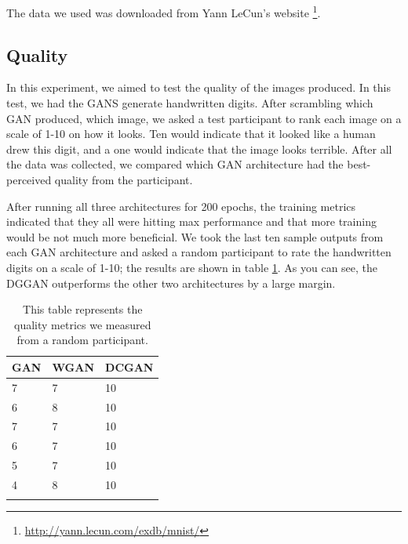 \documentclass[12pt,
 reprint,
nofootinbib,
 amsmath,amssymb,
 aps,
floatfix,
]{revtex4-2}
\begin{document}
The data we used was downloaded from Yann LeCun's website \footnote{\url{http://yann.lecun.com/exdb/mnist/}}.


\subsection{\label{sec:expQuality}Quality}

In this experiment, we aimed to test the quality of the images produced. In this test, we had the GANS generate handwritten digits. After scrambling which GAN produced, which image, we asked a test participant to rank each image on a scale of 1-10 on how it looks. Ten would indicate that it looked like a human drew this digit, and a one would indicate that the image looks terrible. After all the data was collected, we compared which GAN architecture had the best-perceived quality from the participant. 

After running all three architectures for 200 epochs, the training metrics indicated that they all were hitting max performance and that more training would be not much more beneficial. We took the last ten sample outputs from each GAN architecture and asked a random participant to rate the handwritten digits on a scale of 1-10; the results are shown in table \ref{tab:quality}. As you can see, the DGGAN outperforms the other two architectures by a large margin. 

\begin{table}[]
\caption{\label{tab:quality}This table represents the quality metrics we measured from a random participant. }
\begin{tabular}{lll}
\hline
\multicolumn{1}{|l|}{GAN} & \multicolumn{1}{l|}{WGAN} & \multicolumn{1}{l|}{DCGAN} \\ \hline
\multicolumn{1}{|l|}{7}   & \multicolumn{1}{l|}{7}    & \multicolumn{1}{l|}{10}    \\
\multicolumn{1}{|l|}{6}   & \multicolumn{1}{l|}{8}    & \multicolumn{1}{l|}{10}    \\
\multicolumn{1}{|l|}{7}   & \multicolumn{1}{l|}{7}    & \multicolumn{1}{l|}{10}    \\
\multicolumn{1}{|l|}{6}   & \multicolumn{1}{l|}{7}    & \multicolumn{1}{l|}{10}    \\
\multicolumn{1}{|l|}{5}   & \multicolumn{1}{l|}{7}    & \multicolumn{1}{l|}{10}    \\
\multicolumn{1}{|l|}{4}   & \multicolumn{1}{l|}{8}    & \multicolumn{1}{l|}{10}    \\ \hline
                          &                           &                           
\end{tabular}
\end{table}
\end{document}
